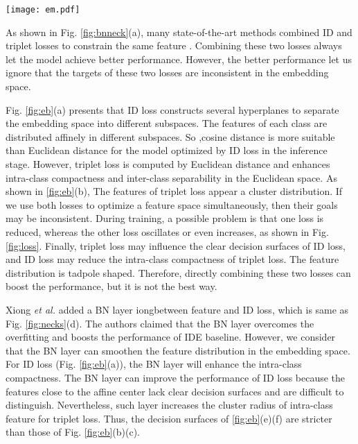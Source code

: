 \documentclass[journal]{IEEEtran}
\begin{document}
\begin{figure*}[htb]
\centering
\vspace{-3mm}
\texttt{[image: em.pdf]}
\vspace{-7mm}
\caption{Two-dimensional visualization of sample distribution in the embedding space supervised by different losses and neck structures. (ag) correspond to (ag) in Fig. \ref{fig:necks}.
Points of different colors represent embedding features from different person IDs. The yellow dotted lines stand for decision surfaces. For better understanding, we make some overexpression compared to Fig. \ref{fig:vis}.}
\label{fig:eb}
\end{figure*}

As shown in Fig. \ref{fig:bnneck}(a), many state-of-the-art methods combined ID and triplet losses to constrain the same feature .
Combining these two losses always let the model achieve better performance.
However, the better performance let us ignore that the targets of these two losses are inconsistent in the embedding space.

Fig. \ref{fig:eb}(a) presents that ID loss constructs several hyperplanes to separate the embedding space into different subspaces.
The features of each class are distributed affinely in different subspaces.
So ,cosine distance is more suitable than Euclidean distance for the model optimized by ID loss in the inference stage.
However, triplet loss is computed by Euclidean distance and enhances intra-class compactness and inter-class separability in the Euclidean space.
As shown in \ref{fig:eb}(b), The features of triplet loss appear a cluster distribution.
If we use both losses to optimize a feature space simultaneously, then their goals may be inconsistent.
During training, a possible problem is that one loss is reduced, whereas the other loss oscillates or even increases, as shown in Fig.\ref{fig:loss}.
Finally, triplet loss may influence the clear decision surfaces of ID loss, and ID loss may reduce the intra-class compactness of triplet loss.
The feature distribution is tadpole shaped. Therefore, directly combining these two losses can boost the performance, but it is not the best way.

Xiong \emph{et al.} \cite{xiong2019good} added a BN layer \cite{ioffe2015batch} iongbetween feature and ID loss, which is same as Fig. \ref{fig:necks}(d).
The authors claimed that the BN layer overcomes the overfitting and boosts the performance of IDE baseline.
However, we consider that the BN layer can smoothen the feature distribution in the embedding space.
For ID loss (Fig. \ref{fig:eb}(a)), the BN layer will enhance the intra-class compactness.
The BN layer can improve the performance of ID loss because the features close to the affine center lack clear decision surfaces and are difficult to distinguish.
Nevertheless, such layer increases the cluster radius of intra-class feature for triplet loss.
Thus, the decision surfaces of \ref{fig:eb}(e)(f) are stricter than those of Fig. \ref{fig:eb}(b)(c).
\end{document}
